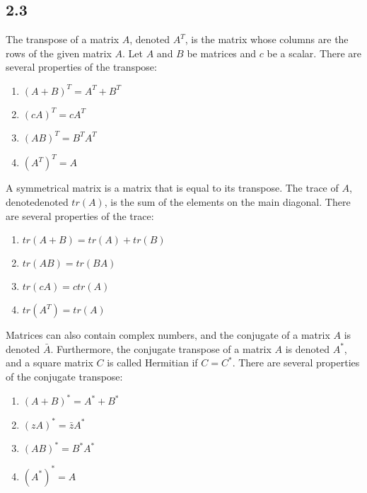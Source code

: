 \documentclass{article}
\begin{document}
    \subsection*{2.3}
    The transpose of a matrix $A$, denoted $A^T$, is the matrix whose columns are the rows of the given matrix $A$.
    Let $A$ and $B$ be matrices and $c$ be a scalar. There are several properties of the transpose:
    \begin{enumerate}
        \item $(A + B)^T = A^T + B^T$
        \item $(cA)^T = cA^T$
        \item $(AB)^T = B^TA^T$
        \item $(A^T)^T = A$
    \end{enumerate}
    A symmetrical matrix is a matrix that is equal to its transpose.
    The trace of $A$, denotedenoted $tr(A)$, is the sum of the elements on the main diagonal.
    There are several properties of the trace:
    \begin{enumerate}
        \item $tr(A + B) = tr(A) + tr(B)$
        \item $tr(AB) = tr(BA)$
        \item $tr(cA) = ctr(A)$
        \item $tr(A^T) = tr(A)$
    \end{enumerate}
    Matrices can also contain complex numbers, 
    and the conjugate of a matrix $A$ is denoted $\bar{A}$.
    Furthermore, the conjugate transpose of a matrix $A$ is denoted $A^*$,
    and a square matrix $C$ is called Hermitian if $C = C^*$.
    There are several properties of the conjugate transpose:
    \begin{enumerate}
        \item $(A + B)^* = A^* + B^*$
        \item $(zA)^* = \bar{z}A^*$
        \item $(AB)^* = B^*A^*$
        \item $(A^*)^* = A$
    \end{enumerate}
\end{document}
